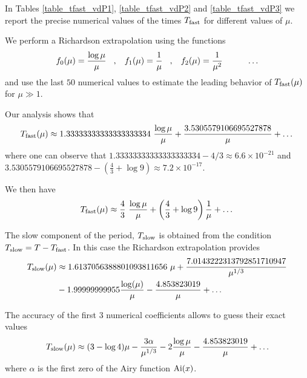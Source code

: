 \documentclass[final]{article}
\begin{document}
In Tables \ref{table_tfast_vdP1}, \ref{table_tfast_vdP2} and \ref{table_tfast_vdP3} we report the precise numerical values of the times 
$T_{\rm fast}$ for different values of $\mu$.
 
We perform a Richardson extrapolation using the functions 
\begin{equation}
\begin{split}
f_0(\mu) = \frac{\log \mu}{\mu} \hspace{0.3cm} , \hspace{0.3cm} f_1(\mu) &=  \frac{1}{\mu}  \hspace{0.3cm} , \hspace{0.3cm} f_2(\mu) = \frac{1}{\mu^2} \hspace{1cm }\dots \\
\end{split}
\end{equation} 
and use the last $50$ numerical values to estimate the leading behavior of $T_{\rm fast}(\mu)$ for $\mu \gg 1$.

Our analysis shows that 
\begin{equation}
	T_{\rm fast}(\mu) \approx 1.33333333333333333334 \ \frac{\log\mu}{\mu} + \frac{3.5305579106695527878}{\mu}  + \dots
\end{equation}
where one can observe that $1.33333333333333333334-4/3 \approx 6.6 \times 10^{-21}$ and $3.5305579106695527878 - \left(\frac{4}{3}+\log 9\right) \approx 7.2 \times 10^{-17}$.

We then have
\begin{equation}
T_{\rm fast}(\mu) \approx \frac{4}{3} \ \frac{\log\mu}{\mu} + \left(\frac{4}{3}+\log 9\right) \frac{1}{\mu}  + \dots
\end{equation}

The slow component of the period, $T_{\rm slow}$ is obtained from the condition $T_{\rm slow} = T - T_{\rm fast}$. In this case
the Richardson extrapolation provides 
\begin{equation}
\begin{split}
T_{\rm slow}(\mu) &\approx  1.6137056388801093811656 \ \mu  +\frac{7.0143222313792851710947}{\mu^{1/3}} \\
&- 1.99999999955 \frac{\log (\mu )}{\mu } -\frac{4.853823019}{\mu}  + \dots
\end{split}
\end{equation}


The accuracy of the first $3$ numerical coefficients allows to guess their exact values
\begin{equation}
\begin{split}
T_{\rm slow}(\mu) \approx (3-\log 4)  \mu - \frac{3 \alpha}{\mu^{1/3}}  - 2 \frac{\log \mu}{\mu}-\frac{4.853823019}{\mu}  + \dots
\end{split}
\end{equation}
where $\alpha$ is the first zero of the Airy function ${\rm Ai}(x)$.
\end{document}
